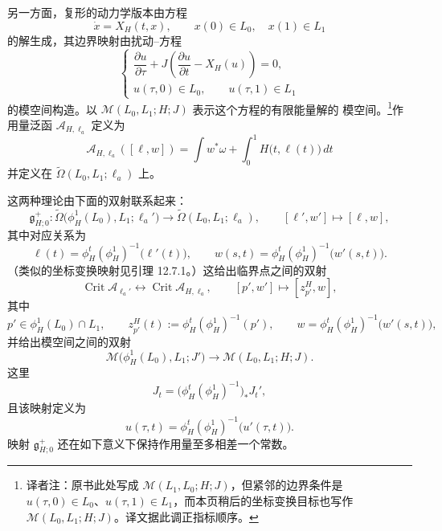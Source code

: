 另一方面，\personFloer{}复形的动力学版本由\personHamilton{}方程
\begin{equation}
  \dot x=X_H(t,x),
  \qquad
  x(0)\in L_0,
  \quad
  x(1)\in L_1
\label{eq:hamiltonian-chord-equation}
\end{equation}
的解生成，其边界映射由扰动\personCauchy{}--\personRiemann{}方程
\begin{equation}
  \begin{cases}
    \dfrac{\partial u}{\partial\tau}
    +J\left(
      \dfrac{\partial u}{\partial t}-X_H(u)
    \right)=0,\\[6pt]
    u(\tau,0)\in L_0,
    \qquad
    u(\tau,1)\in L_1
  \end{cases}
\label{eq:dynamical-floer-equation}
\end{equation}
的模空间构造。以 $\mathcal M(L_0,L_1;H;J)$ 表示这个方程的有限能量解的
模空间。\footnote{译者注：原书此处写成
$\mathcal M(L_1,L_0;H;J)$，但紧邻的边界条件是
$u(\tau,0)\in L_0$、$u(\tau,1)\in L_1$，而本页稍后的坐标变换目标也写作
$\mathcal M(L_0,L_1;H;J)$。译文据此调正指标顺序。}作用量泛函
$\mathcal A_{H,\ell_a}$ 定义为
\begin{equation}
  \mathcal A_{H,\ell_a}([\ell,w])
  =
  \int w^*\omega
  +
  \int_0^1H\bigl(t,\ell(t)\bigr)\,dt
\label{eq:dynamical-action-functional}
\end{equation}
并定义在 $\widetilde\Omega(L_0,L_1;\ell_a)$ 上。

这两种\personFloer{}理论由下面的双射联系起来：
\[
  \mathfrak g_{H;0}^+:
  \widetilde\Omega\bigl(\phi_H^1(L_0),L_1;\ell_a'\bigr)
  \longrightarrow
  \widetilde\Omega(L_0,L_1;\ell_a),
  \qquad
  [\ell',w']\longmapsto[\ell,w],
\]
其中对应关系为
\begin{equation}
  \ell(t)
  =
  \phi_H^t(\phi_H^1)^{-1}\bigl(\ell'(t)\bigr),
  \qquad
  w(s,t)
  =
  \phi_H^t(\phi_H^1)^{-1}\bigl(w'(s,t)\bigr).
\label{eq:coordinate-change-moving-lzero}
\end{equation}
（类似的坐标变换映射见引理 12.7.1。）这给出临界点之间的双射
\begin{equation}
  \operatorname{Crit}\mathcal A_{\ell_a'}
  \longleftrightarrow
  \operatorname{Crit}\mathcal A_{H,\ell_a},
  \qquad
  [p',w']
  \longmapsto
  [z_{p'}^H,w],
\label{eq:coordinate-change-critical-points}
\end{equation}
其中
\[
  p'\in\phi_H^1(L_0)\cap L_1,
  \qquad
  z_{p'}^H(t):=\phi_H^t(\phi_H^1)^{-1}(p'),
  \qquad
  w=\phi_H^t(\phi_H^1)^{-1}\bigl(w'(s,t)\bigr),
\]
并给出模空间之间的双射
\[
  \mathcal M\bigl(\phi_H^1(L_0),L_1;J'\bigr)
  \longrightarrow
  \mathcal M(L_0,L_1;H;J).
\]
这里
\[
  J_t
  =
  \bigl(\phi_H^t(\phi_H^1)^{-1}\bigr)_*J_t',
\]
且该映射定义为
\[
  u(\tau,t)
  =
  \phi_H^t(\phi_H^1)^{-1}\bigl(u'(\tau,t)\bigr).
\]
映射 $\mathfrak g_{H;0}^+$ 还在如下意义下保持作用量至多相差一个常数。

